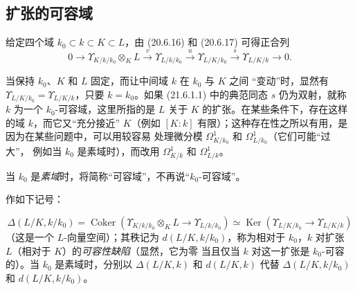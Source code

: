 
\subsection{扩张的可容域}
\label{section:0.21.6-fr}

\begin{env}[21.6.1]
\label{0.21.6.1-fr}
给定四个域 $k_0\subset k\subset K\subset L$，由 (20.6.16) 和 (20.6.17)
可得正合列
\begin{equation}
\tag{21.6.1.1}
\label{0.21.6.1.1-fr}
0\to\Upsilon_{K/k/k_0}\otimes_KL\xrightarrow{v}\Upsilon_{L/k/k_0}
\xrightarrow{u}\Upsilon_{L/K/k_0}\xrightarrow{s}\Upsilon_{L/K/k}\to0.
\end{equation}

当保持 $k_0$、$K$ 和 $L$ 固定，而让中间域 $k$ 在 $k_0$ 与 $K$ 之间
“变动”时，显然有 $\Upsilon_{L/K/k_0}=\Upsilon_{L/K/k}$，只要
$k=k_0$。如果 (21.6.1.1) 中的典范同态 $s$
仍为双射，就称 $k$ 为一个 $k_0$-可容域，这里所指的是 $L$ 关于 $K$
的扩张。在某些条件下，存在这样的域 $k$，而它又“充分接近” $K$（例如
$[K:k]$ 有限）；这种存在性之所以有用，是因为在某些问题中，可以用较容易
处理微分模 $\Omega^1_{K/k_0}$ 和 $\Omega^1_{L/k_0}$（它们可能“过大”，
例如当 $k_0$ 是素域时），而改用 $\Omega^1_{K/k}$ 和 $\Omega^1_{L/k}$。

当 $k_0$ 是\emph{素域}时，将简称“可容域”，不再说“$k_0$-可容域”。

作如下记号：
\end{env}

\begin{env}[21.6.1.2]
\label{0.21.6.1.2-fr}
\[
\Delta(L/K,k/k_0)=\operatorname{Coker}
(\Upsilon_{K/k/k_0}\otimes_KL\to\Upsilon_{L/k/k_0})
\simeq\operatorname{Ker}(\Upsilon_{L/K/k_0}\to\Upsilon_{L/K/k})
\]
（这是一个 $L$-向量空间）；其秩记为 $d(L/K,k/k_0)$，称为相对于
$k_0$，$k$ 对扩张 $L$（相对于 $K$）的\emph{可容性缺陷}（显然，它为零
当且仅当 $k$ 对这一扩张是 $k_0$-可容的）。当 $k_0$ 是素域时，分别以
$\Delta(L/K,k)$ 和 $d(L/K,k)$ 代替 $\Delta(L/K,k/k_0)$ 和
$d(L/K,k/k_0)$。
\end{env}

